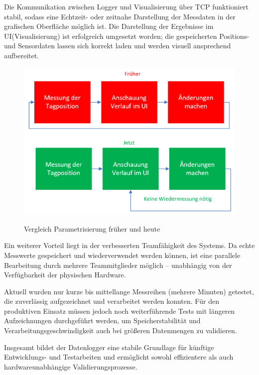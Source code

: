 \documentclass[a4paper, 12pt]{article} %
\begin{document}
Die Kommunikation zwischen Logger und Visualisierung über TCP funktioniert stabil, sodass eine Echtzeit- oder zeitnahe Darstellung 
der Messdaten in der grafischen Oberfläche möglich ist. Die Darstellung der Ergebnisse im \acf{UI}(Visualisierung) ist erfolgreich umgesetzt worden; die gespeicherten
 Positions- und Sensordaten lassen sich korrekt laden und werden visuell ansprechend aufbereitet.

\begin{figure}[H]
    \includegraphics[width=1\linewidth]{images/Vergleich Parametrisierung.png}\\[1ex]
    \centering
    \caption{Vergleich Parametrisierung früher und heute}
    \label{ABBILDUNG}
\end{figure}


Ein weiterer Vorteil liegt in der verbesserten Teamfähigkeit des Systems. Da echte Messwerte gespeichert und wiederverwendet werden können, 
ist eine parallele Bearbeitung durch mehrere Teammitglieder möglich – unabhängig von der Verfügbarkeit der physischen Hardware.

Aktuell wurden nur kurze bis mittellange Messreihen (mehrere Minuten) getestet, die zuverlässig aufgezeichnet und verarbeitet werden konnten. 
Für den produktiven Einsatz müssen jedoch noch weiterführende Tests mit längeren Aufzeichnungen durchgeführt werden, um Speicherstabilität und 
Verarbeitungsgeschwindigkeit auch bei größeren Datenmengen zu validieren.

Insgesamt bildet der Datenlogger eine stabile Grundlage für künftige Entwicklungs- und Testarbeiten und ermöglicht sowohl effizientere als auch 
hardwareunabhängige Validierungsprozesse.
\end{document}
